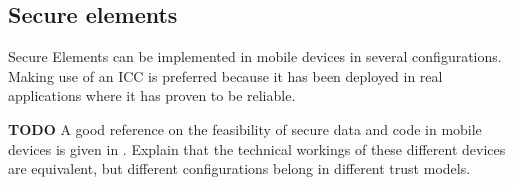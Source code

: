 




\subsection{Secure elements}
Secure Elements can be implemented in mobile devices in several configurations. \cite{Reveilhac:2009:PSE:1548884.1549404}
Making use of an ICC is preferred because it has been deployed in real applications where it has proven to be reliable.


\textbf{TODO}
A good reference on the feasibility of secure data and code in mobile devices is given in \cite{Reveilhac:2009:PSE:1548884.1549404}.
Explain that the technical workings of these different devices are equivalent, but different configurations belong in different trust models.





